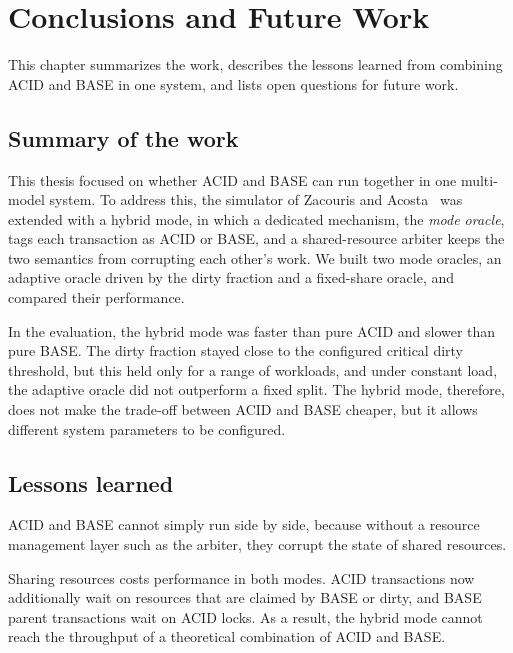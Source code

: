 
\chapter{Conclusions and Future Work}\label{chapter:conclusion}

This chapter summarizes the work, describes the lessons learned from combining
ACID and BASE in one system, and lists open questions for future work.

\section{Summary of the work}\label{sec:concl-summary}

This thesis focused on whether ACID and BASE can run together in one multi-model
system. To address this, the simulator of Zacouris and
Acosta~\cite{zacouris2026mxs} was extended with a hybrid mode, in which a
dedicated mechanism, the \emph{mode oracle}, tags each transaction as ACID or
BASE, and a shared-resource arbiter keeps the two semantics from corrupting each
other's work. We built two mode oracles, an adaptive oracle driven by the dirty
fraction and a fixed-share oracle, and compared their performance.

In the evaluation, the hybrid mode was faster than pure ACID and slower than
pure BASE. The dirty fraction stayed close to the configured critical dirty
threshold, but this held only for a range of workloads, and under constant load,
the adaptive oracle did not outperform a fixed split. The hybrid mode, therefore,
does not make the trade-off between ACID and BASE cheaper, but it allows
different system parameters to be configured.

\section{Lessons learned}\label{sec:concl-lessons}

ACID and BASE cannot simply run side by side, because without a resource
management layer such as the arbiter, they corrupt the state of shared
resources.

Sharing resources costs performance in both modes. ACID transactions now
additionally wait on resources that are claimed by BASE or dirty, and BASE
parent transactions wait on ACID locks. As a result, the hybrid mode cannot
reach the throughput of a theoretical combination of ACID and BASE.

